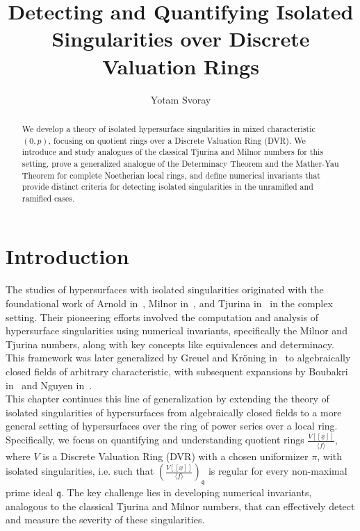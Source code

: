 \documentclass{article}
\title{Detecting and Quantifying Isolated Singularities over Discrete Valuation Rings}
\author{Yotam Svoray}
\date{}
\newcommand{\Vx}{V[[\underline{x}]]}
\numberwithin{theorem}{section}
\begin{document}
\maketitle


\begin{abstract}
        We develop a theory of isolated hypersurface singularities in mixed characteristic $(0,p)$, focusing on quotient rings over a Discrete Valuation Ring (DVR). We introduce and study analogues of the classical Tjurina and Milnor numbers for this setting, prove a generalized analogue of the Determinacy Theorem and the Mather-Yau Theorem for complete Noetherian local rings, and define numerical invariants that provide distinct criteria for detecting isolated singularities in the unramified and ramified cases. 
\end{abstract}


  \tableofcontents




\section{Introduction}\label{Introduction}

The studies of hypersurfaces with isolated singularities originated with the foundational work of Arnold in~\cite{varchenko1985singularities}, Milnor in~\cite{milnor2016singular}, and Tjurina in~\cite{tjurina1969locally} in the complex setting. Their pioneering efforts involved the computation and analysis of hypersurface singularities using numerical invariants, specifically the Milnor and Tjurina numbers, along with key concepts like equivalences and determinacy. This framework was later generalized by Greuel and Kr\"{o}ning in~\cite{greuel1990simple} to algebraically closed fields of arbitrary characteristic, with subsequent expansions by Boubakri in~\cite{boubakri2009hypersurface} and Nguyen in~\cite{Nguyen2013classification}.\\


This chapter continues this line of generalization by extending the theory of isolated singularities of hypersurfaces from algebraically closed fields to a more general setting of hypersurfaces over the ring of power series over a local ring. Specifically, we focus on quantifying and understanding quotient rings $\frac{V[[\underline{x}]]}{\langle f \rangle}$, where $V$ is a Discrete Valuation Ring (DVR) with a chosen uniformizer $\pi$, with isolated singularities, i.e. such that $\left(\frac{\Vx}{\langle f \rangle}\right)_\mathfrak{q}$ is regular for every non-maximal prime ideal $\mathfrak{q}$. The key challenge lies in developing numerical invariants, analogous to the classical Tjurina and Milnor numbers, that can effectively detect and measure the severity of these singularities.\\
\end{document}
